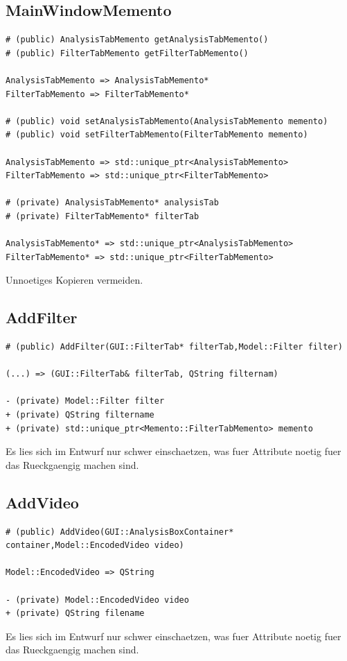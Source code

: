 \documentclass[parskip=full]{scrartcl}
\begin{document}
\subsection{MainWindowMemento}
\begin{verbatim}
# (public) AnalysisTabMemento getAnalysisTabMemento()
# (public) FilterTabMemento getFilterTabMemento()

AnalysisTabMemento => AnalysisTabMemento*
FilterTabMemento => FilterTabMemento*

# (public) void setAnalysisTabMemento(AnalysisTabMemento memento)
# (public) void setFilterTabMemento(FilterTabMemento memento)

AnalysisTabMemento => std::unique_ptr<AnalysisTabMemento>
FilterTabMemento => std::unique_ptr<FilterTabMemento>

# (private) AnalysisTabMemento* analysisTab
# (private) FilterTabMemento* filterTab

AnalysisTabMemento* => std::unique_ptr<AnalysisTabMemento>
FilterTabMemento* => std::unique_ptr<FilterTabMemento>

\end{verbatim}
Unnoetiges Kopieren vermeiden.
\subsection{AddFilter}
\begin{verbatim}
# (public) AddFilter(GUI::FilterTab* filterTab,Model::Filter filter)

(...) => (GUI::FilterTab& filterTab, QString filternam)

- (private) Model::Filter filter
+ (private) QString filtername
+ (private) std::unique_ptr<Memento::FilterTabMemento> memento
\end{verbatim}
Es lies sich im Entwurf nur schwer einschaetzen, was fuer Attribute noetig fuer das Rueckgaengig machen sind. 

\subsection{AddVideo}
\begin{verbatim}
# (public) AddVideo(GUI::AnalysisBoxContainer* container,Model::EncodedVideo video)

Model::EncodedVideo => QString

- (private) Model::EncodedVideo video
+ (private) QString filename
\end{verbatim}
Es lies sich im Entwurf nur schwer einschaetzen, was fuer Attribute noetig fuer das Rueckgaengig machen sind. 
\end{document}
